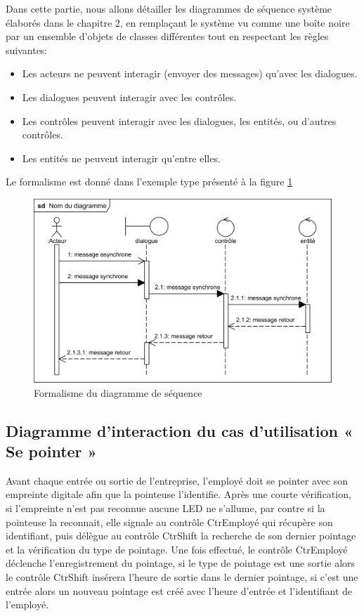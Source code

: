 Dans cette partie, nous allons détailler les diagrammes de séquence système 
élaborés dans le chapitre 2, en remplaçant le système vu comme une boîte 
noire par un ensemble d’objets de classes différentes tout en respectant 
les règles suivantes:

\begin{itemize}
        \item[\textbullet] Les acteurs ne peuvent interagir (envoyer des messages) 
            qu’avec les dialogues.
        \item[\textbullet] Les dialogues peuvent interagir avec les contrôles. 
        \item[\textbullet] Les contrôles peuvent interagir avec les dialogues, les 
            entités, ou d’autres contrôles.
        \item[\textbullet] Les entités ne peuvent interagir qu’entre elles.             
\end{itemize}

Le formalisme est donné dans l’exemple type présenté à la figure \ref{fig33}\\

\begin{figure}[h!]
    \centering                 
    \includegraphics[scale=1.23]{images/exemple ds.png}
    \caption{Formalisme du diagramme de séquence}
    \label{fig33}
\end{figure}

\clearpage
    
\subsection*{Diagramme d'interaction du cas d'utilisation « Se pointer »}
Avant chaque entrée ou sortie de l’entreprise, l’employé doit se pointer avec son 
empreinte digitale afin que la pointeuse l’identifie. Après une courte 
vérification, si l’empreinte n’est pas reconnue aucune LED ne s’allume, par 
contre si la pointeuse la reconnait, elle signale au contrôle CtrEmployé qui 
récupère son identifiant, puis délègue au contrôle CtrShift la recherche de son 
dernier pointage et la vérification du type de pointage. Une fois effectué, le 
contrôle CtrEmployé déclenche l’enregistrement du pointage, si le type de 
pointage est une sortie alors le contrôle CtrShift insérera l’heure de sortie 
dans le dernier pointage, si c’est une entrée alors un nouveau pointage est 
créé avec l’heure d’entrée et l’identifiant de l’employé.

